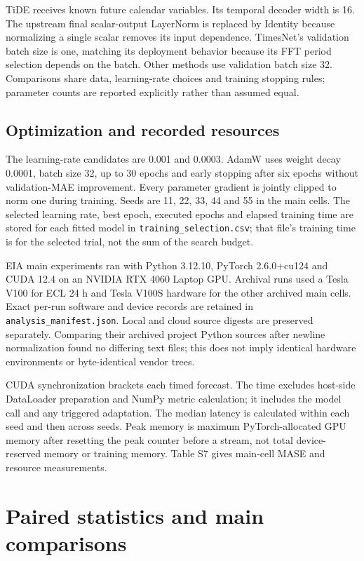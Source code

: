 \documentclass[11pt,a4paper]{article}
\begin{document}
TiDE receives known future calendar variables. Its temporal decoder width is 16. The upstream final scalar-output LayerNorm is replaced by Identity because normalizing a single scalar removes its input dependence. TimesNet's validation batch size is one, matching its deployment behavior because its FFT period selection depends on the batch. Other methods use validation batch size 32. Comparisons share data, learning-rate choices and training stopping rules; parameter counts are reported explicitly rather than assumed equal.

\subsection{Optimization and recorded resources}
The learning-rate candidates are 0.001 and 0.0003. AdamW uses weight decay 0.0001, batch size 32, up to 30 epochs and early stopping after six epochs without validation-MAE improvement. Every parameter gradient is jointly clipped to norm one during training. Seeds are 11, 22, 33, 44 and 55 in the main cells. The selected learning rate, best epoch, executed epochs and elapsed training time are stored for each fitted model in \texttt{training\_selection.csv}; that file's training time is for the selected trial, not the sum of the search budget.

EIA main experiments ran with Python 3.12.10, PyTorch 2.6.0+cu124 and CUDA 12.4 on an NVIDIA RTX 4060 Laptop GPU. Archival runs used a Tesla V100 for ECL 24 h and Tesla V100S hardware for the other archived main cells. Exact per-run software and device records are retained in \texttt{analysis\_manifest.json}. Local and cloud source digests are preserved separately. Comparing their archived project Python sources after newline normalization found no differing text files; this does not imply identical hardware environments or byte-identical vendor trees.

CUDA synchronization brackets each timed forecast. The time excludes host-side DataLoader preparation and NumPy metric calculation; it includes the model call and any triggered adaptation. The median latency is calculated within each seed and then across seeds. Peak memory is maximum PyTorch-allocated GPU memory after resetting the peak counter before a stream, not total device-reserved memory or training memory. Table S7 gives main-cell MASE and resource measurements.

\section{Paired statistics and main comparisons}
\end{document}
